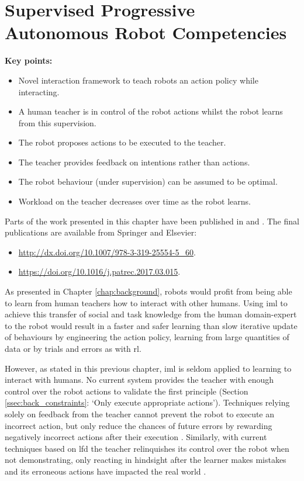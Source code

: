 \chapter{Supervised Progressive Autonomous Robot \newline Competencies}\label{chap:sparc}
\glsresetall
\graphicspath{{images/sparc/}}

\begin{framed}
	\textbf{Key points:}
	\begin{itemize}
		\item Novel interaction framework to teach robots an action policy while interacting.
		\item A human teacher is in control of the robot actions whilst the robot learns from this supervision.
		\item The robot proposes actions to be executed to the teacher.
		\item The teacher provides feedback on intentions rather than actions.
		\item The robot behaviour (under supervision) can be assumed to be optimal.
		\item Workload on the teacher decreases over time as the robot learns.
	\end{itemize}
\end{framed}

Parts of the work presented in this chapter have been published in \cite{senft2015sparc} and \cite{senft2017supervised}. The final publications are available from Springer and Elsevier:
\begin{itemize}
	\item \url{http://dx.doi.org/10.1007/978-3-319-25554-5_60}.
	\item \url{https://doi.org/10.1016/j.patrec.2017.03.015}.
\end{itemize}

\newpage

As presented in Chapter \ref{chap:background}, robots would profit from being able to learn from human teachers how to interact with other humans. Using \gls{iml} to achieve this transfer of social and task knowledge from the human domain-expert to the robot would result in a faster and safer learning than slow iterative update of behaviours by engineering the action policy, learning from large quantities of data or by trials and errors as with \gls{rl}.

However, as stated in this previous chapter, \gls{iml} is seldom applied to learning to interact with humans. No current system provides the teacher with enough control over the robot actions to validate the first principle (Section \ref{ssec:back_constraints}: `Only execute appropriate actions'). Techniques relying solely on feedback from the teacher cannot prevent the robot to execute an incorrect action, but only reduce the chances of future errors by rewarding negatively incorrect actions after their execution \citep{senft2017supervised}. Similarly, with current techniques based on \gls{lfd} the teacher relinquishes its control over the robot when not demonstrating, only reacting in hindsight after the learner makes mistakes and its erroneous actions have impacted the real world \citep{chernova2009interactive}.

